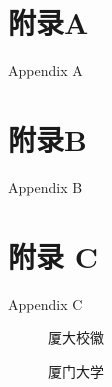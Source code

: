 \documentclass[bibstyle=numbers,font=empty]{Settings/XMUthesis}%
\begin{document}
\maketitle



\xmutableofcontents
\pagestyle{fancy}



\backmatter


\chapter{附录A}{Appendix A}

\chapter{附录B}{Appendix B}

\showfont

\chapter{附录 C}{Appendix C}
\begin{figure}[htbp!]
\centering
\caption{厦大校徽}
\xmulogo[0.75]
\end{figure}
\begin{figure}[htbp!]
\centering
\caption{厦门大学}
\xmulogon[0.75]
\end{figure}
\end{document}
